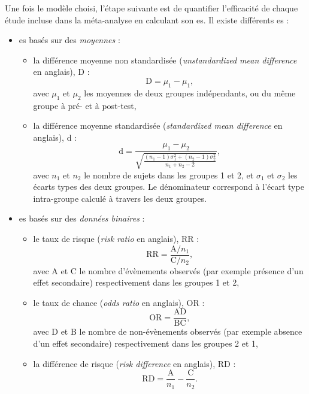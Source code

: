 Une fois le modèle choisi, l'étape suivante est de quantifier l'efficacité de chaque étude incluse dans la méta-analyse en calculant son \gls{es}. 
Il existe différents \gls{es} \citep{Borenstein2009} :
\renewcommand{\labelitemi}{$\bullet$}
\renewcommand{\labelitemii}{$\cdot$}
\begin{itemize}
\item \gls{es} basés sur des \emph{moyennes} :
\begin{itemize}
    \item la différence moyenne non standardisée (\textit{unstandardized mean difference} en anglais), D :
		    \begin{equation}
        \label{eq:metareview_unstandardized_mean_difference}
        \text{D} = \mu_{1} - \mu_{1},
        \end{equation} 
		avec $\mu_{1}$ et $\mu_{2}$ les moyennes de deux groupes indépendants, ou du même groupe à pré- et à post-test,
    \item la différence moyenne standardisée (\textit{standardized mean difference} en anglais), d :
		    \begin{equation}
        \label{eq:metareview_standardized_mean_difference}
        \text{d} = \frac{\mu_{1} - \mu_{2}}{\sqrt{\frac{(n_1 - 1)\sigma_1^2 + (n_2 - 1)\sigma_2^2} {n_1 + n_2 - 2}}},
        \end{equation} 
		avec $n_{1}$ et $n_{2}$ le nombre de sujets dans les groupes 1 et 2, et $\sigma_{1}$ et $\sigma_{2}$ les écarts types des deux groupes. Le dénominateur
		correspond à l'écart type intra-groupe calculé à travers les deux groupes.
\end{itemize}
\item \gls{es} basés sur des \emph{données binaires} :
\begin{itemize}
    \item le taux de risque (\textit{risk ratio} en anglais), RR :
				\begin{equation}
        \label{eq:metareview_risk_ratio}
        \text{RR} = \frac{ \text{A} / n_1 } { \text{C} / n_2 },
        \end{equation} 
		avec A et C le nombre d'évènements observés (par exemple présence d'un effet secondaire) respectivement dans les groupes 1 et 2,
    \item le taux de chance (\textit{odds ratio} en anglais), OR :
				\begin{equation}
        \label{eq:metareview_odds_ratio}
        \text{OR} = \frac{ \text{AD} } { \text{BC} },
        \end{equation} 		
		avec D et B le nombre de non-évènements observés (par exemple absence d'un effet secondaire) respectivement dans les groupes 2 et 1,
		\item la différence de risque (\textit{risk difference} en anglais), RD :
				\begin{equation}
        \label{eq:metareview_risk_difference}
        \text{RD} = \frac{ \text{A} } { n_1 } - \frac{ \text{C} } { n_2 }.
        \end{equation}
\end{itemize}
\end{itemize}

